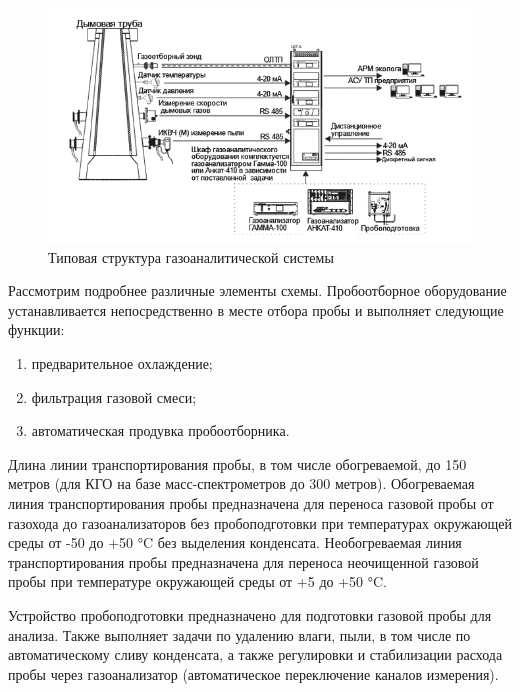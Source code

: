 \documentclass[14pt, a4paper]{extreport}
\begin{document}
	\begin{figure}[h!]
		\centering
		\includegraphics[width = \textwidth]{image/chapter_1/typestructure}	
		\caption{Типовая структура газоаналитической системы}
		\label{fig:typestructure}
	\end{figure}
	
	Рассмотрим подробнее различные элементы схемы. Пробоотборное оборудование устанавливается непосредственно в месте отбора пробы и выполняет следующие функции:
	\begin{enumerate}[label={\arabic*)}]
		\item предварительное охлаждение;
		\item фильтрация газовой смеси;
		\item автоматическая продувка пробоотборника.
	\end{enumerate}
	
	Длина линии транспортирования пробы, в том числе обогреваемой, до 150 метров (для КГО на базе масс-спектрометров до 300 метров). Обогреваемая линия транспортирования пробы предназначена для переноса газовой пробы от газохода до газоанализаторов без пробоподготовки при температурах окружающей среды от -50 до +50 °C без выделения конденсата. Необогреваемая линия транспортирования пробы предназначена для переноса неочищенной газовой пробы при температуре окружающей среды от +5 до +50 °C.
	
	Устройство пробоподготовки предназначено для подготовки газовой пробы для анализа. Также выполняет задачи по удалению влаги, пыли, в том числе по автоматическому сливу конденсата, а также регулировки и стабилизации расхода пробы через газоанализатор (автоматическое переключение каналов измерения).
	
\end{document}
